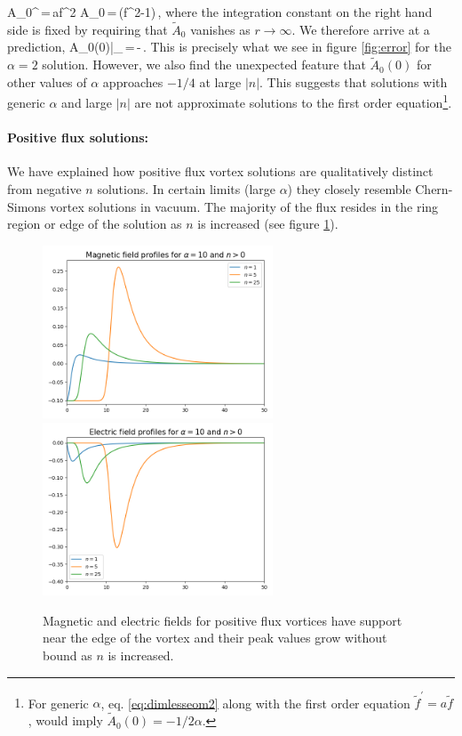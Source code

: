 \be
\tilde A_0^\prime\,=\,a\tilde f^2 \quad{}  \quad 
\tilde A_0\,=\,\left(\tilde f^2-1\right)\,,
\ee
where the integration constant on the right hand side is fixed by requiring that $\tilde A_0$ vanishes as $r\to\infty$. 
We therefore arrive at a prediction,
\be
\tilde A_0(0)\big|_{}\,=\,-\,.
\ee
This is precisely what we see in figure \ref{fig:error} for the $\alpha=2$ solution. However, we also find the unexpected feature that $\tilde A_0(0)$ for other values of $\alpha$ approaches $-1/4$ at large $|n|$. This suggests  that solutions with generic $\alpha$ and large $|n|$ are not approximate  solutions to the first order equation\footnote{For generic $\alpha$, eq. \eqref{eq:dimlesseom2} along with the first order equation $\tilde f^\prime = a \tilde f$, would imply $\tilde A_0(0)=-1/2\alpha$. }.
\paragraph{Positive flux solutions:}
We have explained how positive flux vortex solutions are qualitatively distinct from negative $n$ solutions. In certain limits (large $\alpha$) they closely resemble  Chern-Simons vortex solutions in vacuum.  
The majority of the flux resides in the ring region or edge of the solution as $n$ is increased (see figure \ref{positiveprofile}).
\begin{figure}[H]
\begin{center}
 \includegraphics[width=2.7in]{Chapter_2_Folder_1912.11321/figures/B_alpha_10_positive_final.png} \includegraphics[width=2.7in]{Chapter_2_Folder_1912.11321/figures/E_alpha_10_positive_final.png}
     \caption[This figure depicts the magnetic and electric field profiles for positive flux.]{{Magnetic and electric fields for positive flux vortices have support near the edge of the vortex and their peak values grow without bound as $n$ is increased.}} \label{positiveprofile}
    \end{center}
\end{figure} 



